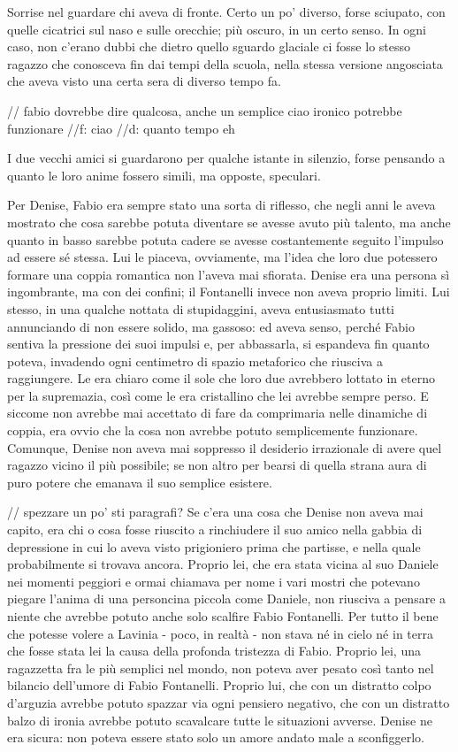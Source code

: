 Sorrise nel guardare chi aveva di fronte. Certo un po' diverso, forse sciupato, con quelle cicatrici sul naso e sulle orecchie; più oscuro, in un certo senso. In ogni caso, non c'erano dubbi che dietro quello sguardo glaciale ci fosse lo stesso ragazzo che conosceva fin dai tempi della scuola, nella stessa versione angosciata che aveva visto una certa sera di diverso tempo fa.

// fabio dovrebbe dire qualcosa, anche un semplice ciao ironico potrebbe funzionare
//f: ciao
//d: quanto tempo eh

I due vecchi amici si guardarono per qualche istante in silenzio, forse pensando a quanto le loro anime fossero simili, ma opposte, speculari.

Per Denise, Fabio era sempre stato una sorta di riflesso, che negli anni le aveva mostrato che cosa sarebbe potuta diventare se avesse avuto più talento, ma anche quanto in basso sarebbe potuta cadere se avesse costantemente seguito l'impulso ad essere sé stessa. Lui le piaceva, ovviamente, ma l'idea che loro due potessero formare una coppia romantica non l'aveva mai sfiorata. Denise era una persona sì ingombrante, ma con dei confini; il Fontanelli invece non aveva proprio limiti. Lui stesso, in una qualche nottata di stupidaggini, aveva entusiasmato tutti annunciando di non essere solido, ma gassoso: ed aveva senso, perché Fabio sentiva la pressione dei suoi impulsi e, per abbassarla, si espandeva fin quanto poteva, invadendo ogni centimetro di spazio metaforico che riusciva a raggiungere. Le era chiaro come il sole che loro due avrebbero lottato in eterno per la supremazia, così come le era cristallino che lei avrebbe sempre perso. E siccome non avrebbe mai accettato di fare da comprimaria nelle dinamiche di coppia, era ovvio che la cosa non avrebbe potuto semplicemente funzionare. Comunque, Denise non aveva mai soppresso il desiderio irrazionale di avere quel ragazzo vicino il più possibile; se non altro per bearsi di quella strana aura di puro potere che emanava il suo semplice esistere.

// spezzare un po' sti paragrafi?
Se c'era una cosa che Denise non aveva mai capito, era chi o cosa fosse riuscito a rinchiudere il suo amico nella gabbia di depressione in cui lo aveva visto prigioniero prima che partisse, e nella quale probabilmente si trovava ancora. Proprio lei, che era stata vicina al suo Daniele nei momenti peggiori e ormai chiamava per nome i vari mostri che potevano piegare l'anima di una personcina piccola come Daniele, non riusciva a pensare a niente che avrebbe potuto anche solo scalfire Fabio Fontanelli. Per tutto il bene che potesse volere a Lavinia - poco, in realtà - non stava né in cielo né in terra che fosse stata lei la causa della profonda tristezza di Fabio. Proprio lei, una ragazzetta fra le più semplici nel mondo, non poteva aver pesato così tanto nel bilancio dell'umore di Fabio Fontanelli. Proprio lui, che con un distratto colpo d'arguzia avrebbe potuto spazzar via ogni pensiero negativo, che con un distratto balzo di ironia avrebbe potuto scavalcare tutte le situazioni avverse. Denise ne era sicura: non poteva essere stato solo un amore andato male a sconfiggerlo.

